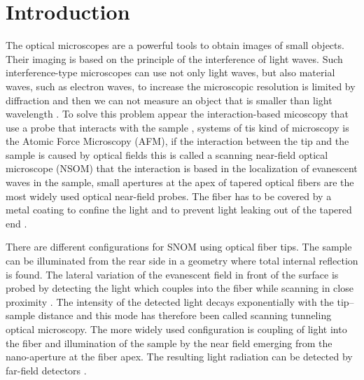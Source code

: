 \documentclass[reprint,aps,prb,citeautoscript,altaffilletter]{revtex4-2}
\begin{document}
	\section{Introduction}
	The optical microscopes are a powerful tools to obtain images of small objects. Their imaging is based on the principle of the
	interference of light waves. Such interference-type microscopes can use not only light waves, but also material waves, such as electron waves, to increase
	the microscopic resolution is limited by diffraction and then we can not measure an object that is smaller than light wavelength \cite{otshu-nf}. To solve this problem appear the
	interaction-based micoscopy that use a probe that interacts with the sample \cite{scannPr}, systems of tis kind of microscopy is the Atomic Force Microscopy (AFM), if the interaction between the tip and the sample is caused by 
	optical fields this is called a scanning near-field optical microscope (NSOM) that the interaction is based in the localization of evanescent waves in the sample\cite{novotny_hecht_2012}, small apertures at the apex of tapered optical fibers are the most widely used
	optical near-field probes. The fiber has to be covered by a metal coating to confine the light and to prevent light leaking out of the tapered end \cite{otshu-nf, scannPr}.
	\par There are different configurations for SNOM using optical fiber tips. The sample can be illuminated from the rear side in a geometry where total internal reflection is found. The lateral variation of the evanescent field in front of the surface is probed
	by detecting the light which couples into the fiber while scanning in close proximity \cite{otshu-nf2}. The intensity of the detected light decays exponentially with the tip–sample distance
	and this mode has therefore been called scanning tunneling optical microscopy. The more widely used configuration is coupling of light into the fiber and illumination of the sample by the near field emerging from the nano-aperture at the fiber apex. The
	resulting light radiation can be detected by far-field detectors \cite{scannPr}.
\end{document}
